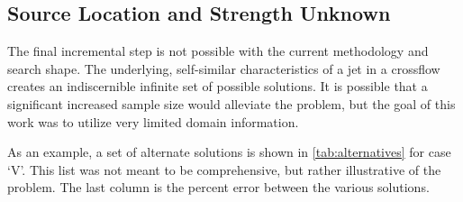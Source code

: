 \documentclass[preprint,12pt]{elsarticle}
\begin{document}
\subsection{Source Location and Strength Unknown}
The final incremental step is not possible with the current methodology and search shape.  The underlying, self-similar characteristics of a jet in a crossflow creates an indiscernible infinite set of possible solutions.  It is possible that a significant increased sample size would alleviate the problem, but the goal of this work was to utilize very limited domain information.

As an example, a set of alternate solutions is shown in \cref{tab:alternatives} for case `V'.  This list was not meant to be comprehensive, but rather illustrative of the problem.  The last column is the percent error between the various solutions.



\end{document}
